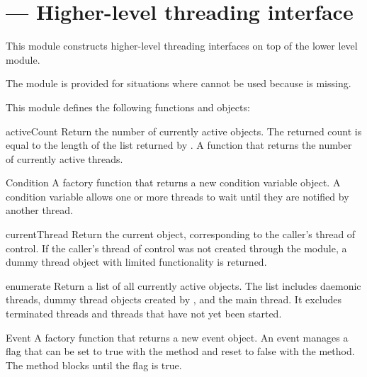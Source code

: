 \section{ ---
         Higher-level threading interface}



This module constructs higher-level threading interfaces on top of the 
lower level  module.

The  module is provided for
situations where  cannot be used because
 is missing.

This module defines the following functions and objects:

\begin{funcdesc}{activeCount}{}
Return the number of currently active  objects.
The returned count is equal to the length of the list returned by
.
A function that returns the number of currently active threads.
\end{funcdesc}

\begin{funcdesc}{Condition}{}
A factory function that returns a new condition variable object.
A condition variable allows one or more threads to wait until they
are notified by another thread.
\end{funcdesc}

\begin{funcdesc}{currentThread}{}
Return the current  object, corresponding to the
caller's thread of control.  If the caller's thread of control was not
created through the
 module, a dummy thread object with limited functionality
is returned.
\end{funcdesc}

\begin{funcdesc}{enumerate}{}
Return a list of all currently active  objects.
The list includes daemonic threads, dummy thread objects created
by , and the main thread.  It excludes terminated
threads and threads that have not yet been started.
\end{funcdesc}

\begin{funcdesc}{Event}{}
A factory function that returns a new event object.  An event manages
a flag that can be set to true with the  method and
reset to false with the  method.  The 
method blocks until the flag is true.
\end{funcdesc}

